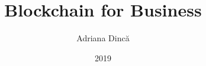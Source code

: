 \title{Blockchain for Business}
\author{Adriana Dincă}
\date{2019}



\newcommand{\project}{Business Network Modeling}


